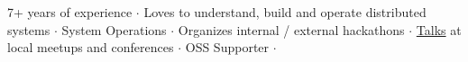 

\begin{cvparagraph}
7+ years of experience ${\cdotp}$ Loves to understand, build and operate distributed systems ${\cdotp}$ System Operations ${\cdotp}$ Organizes internal / external hackathons ${\cdotp}$ \href{https://github.com/ashwanthkumar/talks}{Talks} at local meetups and conferences ${\cdotp}$ OSS Supporter ${\cdotp}$
\end{cvparagraph}
